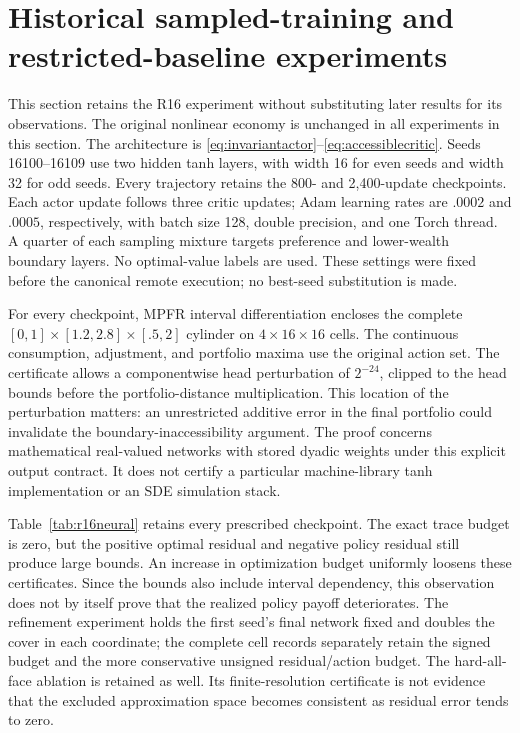 \section{Historical sampled-training and restricted-baseline experiments}\label{sec:r16neural}
This section retains the R16 experiment without substituting later results for its observations. The original nonlinear economy is unchanged in all experiments in this section. The architecture is \eqref{eq:invariantactor}--\eqref{eq:accessiblecritic}. Seeds 16100--16109 use two hidden tanh layers, with width 16 for even seeds and width 32 for odd seeds. Every trajectory retains the 800- and 2,400-update checkpoints. Each actor update follows three critic updates; Adam learning rates are $.0002$ and $.0005$, respectively, with batch size 128, double precision, and one Torch thread. A quarter of each sampling mixture targets preference and lower-wealth boundary layers. No optimal-value labels are used. These settings were fixed before the canonical remote execution; no best-seed substitution is made.

For every checkpoint, MPFR interval differentiation encloses the complete $[0,1]\times[1.2,2.8]\times[.5,2]$ cylinder on $4\times16\times16$ cells. The continuous consumption, adjustment, and portfolio maxima use the original action set. The certificate allows a componentwise head perturbation of $2^{-24}$, clipped to the head bounds before the portfolio-distance multiplication. This location of the perturbation matters: an unrestricted additive error in the final portfolio could invalidate the boundary-inaccessibility argument. The proof concerns mathematical real-valued networks with stored dyadic weights under this explicit output contract. It does not certify a particular machine-library tanh implementation or an SDE simulation stack.


Table~\ref{tab:r16neural} retains every prescribed checkpoint. The exact trace budget is zero, but the positive optimal residual and negative policy residual still produce large bounds. An increase in optimization budget uniformly loosens these certificates. Since the bounds also include interval dependency, this observation does not by itself prove that the realized policy payoff deteriorates. The refinement experiment holds the first seed's final network fixed and doubles the cover in each coordinate; the complete cell records separately retain the signed budget and the more conservative unsigned residual/action budget. The hard-all-face ablation is retained as well. Its finite-resolution certificate is not evidence that the excluded approximation space becomes consistent as residual error tends to zero.

